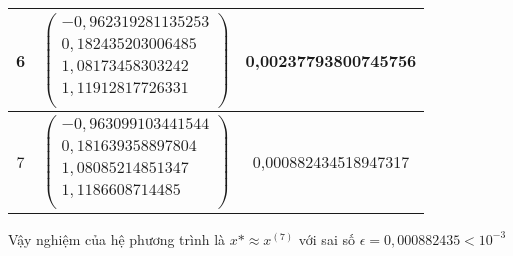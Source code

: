 \begin{center}
\begin{tabular}{|c|c|c|}
6&$\begin{pmatrix}-0,962319281135253\\0,182435203006485\\1,08173458303242\\1,11912817726331\\\end{pmatrix}$&0,00237793800745756\\\hline
7&$\begin{pmatrix}-0,963099103441544\\0,181639358897804\\1,08085214851347\\1,1186608714485\\\end{pmatrix}$&0,000882434518947317\\\hline
\end{tabular}
\end{center}
Vậy nghiệm của hệ phương trình là $x* \approx x^{(7)} $ với sai số $\epsilon=0,000882435
<10^{-3} $
\par

